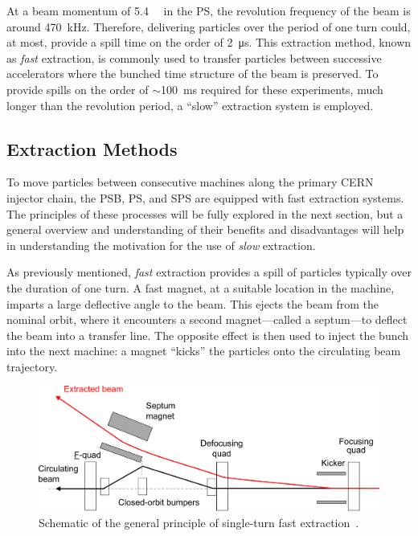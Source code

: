 \documentclass[a4paper,twoside,11pt]{report}
\begin{document}
At a beam momentum of \qty{5.4}{\giga\eVperc} in the PS, the revolution frequency of the beam is around \qty{470}{kHz}. Therefore, delivering particles over the period of one turn could, at most, provide a spill time on the order of \qty{2}{\micro\second}. This extraction method, known as \textit{fast} extraction, is commonly used to transfer particles between successive accelerators where the bunched time structure of the beam is preserved. To provide spills on the order of $\sim$\qty{100}{\ms} required for these experiments, much longer than the revolution period, a ``slow'' extraction system is employed.

\subsection{Extraction Methods}

To move particles between consecutive machines along the primary CERN injector chain, the PSB, PS, and SPS are equipped with fast extraction systems. The principles of these processes will be fully explored in the next section, but a general overview and understanding of their benefits and disadvantages will help in understanding the motivation for the use of \textit{slow} extraction.

As previously mentioned, \textit{fast} extraction provides a spill of particles typically over the duration of one turn. A fast magnet, at a suitable location in the machine, imparts a large deflective angle to the beam. This ejects the beam from the nominal orbit, where it encounters a second magnet---called a septum---to deflect the beam into a transfer line. The opposite effect is then used to inject the bunch into the next machine: a magnet ``kicks'' the particles onto the circulating beam trajectory.

\begin{figure}[h]
  \centering
  \includegraphics[width=\linewidth]{fast.png}
  \caption{Schematic of the general principle of single-turn fast extraction~\cite{Fraser:CAS}.}\label{fig:fast_diagram}
\end{figure}
\end{document}
